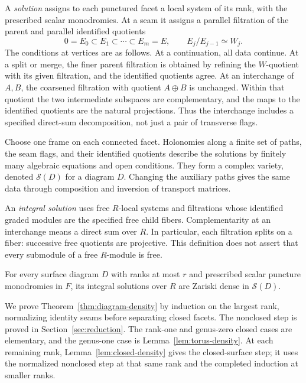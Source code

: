 A \emph{solution} assigns to each punctured facet a local system of its
rank, with the prescribed scalar monodromies.  At a seam it assigns a
parallel filtration of the parent and parallel identified quotients
\[
 0=E_0\subset E_1\subset\cdots\subset E_m=E,
 \qquad E_j/E_{j-1}\simeq W_j.
\]
The conditions at vertices are as follows.  At a continuation, all data
continue.  At a split or merge, the finer parent filtration is obtained
by refining the $W$-quotient with its given filtration, and the
identified quotients agree.  At an interchange of $A,B$, the coarsened
filtration with quotient $A\oplus B$ is unchanged.  Within that quotient
the two intermediate subspaces are complementary, and the maps to
the identified quotients are the natural projections.  Thus the
interchange includes a specified direct-sum decomposition, not just a
pair of transverse flags.

Choose one frame on each connected facet.  Holonomies along a finite
set of paths, the seam flags, and their identified quotients describe
the solutions by finitely many algebraic equations and open conditions.
They form a complex variety, denoted $\mathcal S(D)$ for a diagram $D$.
Changing the auxiliary paths gives the same data through composition
and inversion of transport matrices.

An \emph{integral solution} uses free $R$-local systems and filtrations
whose identified graded modules are the specified free child fibers.
Complementarity at an interchange means a direct sum over $R$.
In particular, each filtration splits on a fiber: successive free
quotients are projective.  This definition does not assert that every
submodule of a free $R$-module is free.

\begin{theorem}\label{thm:diagram-density}
For every surface diagram $D$ with ranks at most $r$ and prescribed
scalar puncture monodromies in $F$, its integral solutions over $R$
are Zariski dense in $\mathcal S(D)$.
\end{theorem}

We prove Theorem~\ref{thm:diagram-density} by induction on the largest
rank, normalizing identity seams before separating closed facets.
The nonclosed step is proved in Section~\ref{sec:reduction}.
The rank-one and genus-zero closed cases are elementary, and the
genus-one case is Lemma~\ref{lem:torus-density}.  At each remaining
rank, Lemma~\ref{lem:closed-density} gives the closed-surface step;
it uses the normalized nonclosed step at that same rank and the
completed induction at smaller ranks.

